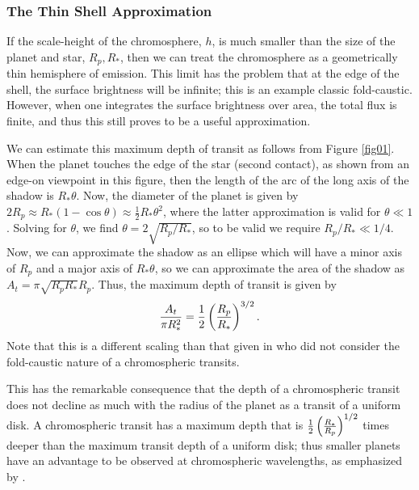 \documentclass[manuscript]{aastex}
\begin{document}
\subsubsection{The Thin Shell Approximation}

If the scale-height of the chromosphere, $h$, is much smaller than the
size of the planet and star, $R_p, R_*$, then we can treat the
chromosphere as a geometrically thin hemisphere of emission.  This
limit has the problem that at the edge of the shell, the surface
brightness will be infinite; this is an example classic fold-caustic.
However, when one integrates the surface brightness over area, the
total flux is finite, and thus this still proves to be a useful
approximation.


We can estimate this maximum depth of transit as follows from
Figure \ref{fig01}.  When the planet touches the edge of the star 
(second contact), as shown from an edge-on viewpoint in this figure,
then the length of the arc of the long axis of the shadow is
$R_*\theta$.  Now, the diameter of the planet is given by 
$2 R_p \approx R_*(1-\cos{\theta}) \approx \frac{1}{2} R_* \theta^2$,
where the latter approximation is valid for $\theta \ll 1$.
Solving for $\theta$, we find $\theta = 2\sqrt{R_p/R_*}$, so to
be valid we require $R_p/R_* \ll 1/4$.  Now, we can approximate
the shadow as an ellipse which will have a minor axis of $R_p$
and a major axis of $R_*\theta$, so we can approximate the
area of the shadow as $A_t = \pi \sqrt{R_pR_*} R_p$.  Thus,
the maximum depth of transit is given by 
\begin{equation} \label{depth_anal}
{A_t \over \pi R_*^2} = \frac{1}{2} \left({R_p \over R_*}\right)^{3/2}.
\end{equation}
Note that this is a different scaling than that given in \citet{assef} who did not consider the fold-caustic nature of a chromospheric
transits.

This has the remarkable consequence that the depth of a chromospheric
transit does not decline as much with the radius of the planet as 
a transit of a uniform disk.  A chromospheric transit has a maximum
depth that is $\frac{1}{2} \left({R_* \over R_p}\right)^{1/2}$
times deeper than the maximum transit depth of a uniform disk;
thus smaller planets have an advantage to be observed at
chromospheric wavelengths, as emphasized by \citet{assef}.
\end{document}
